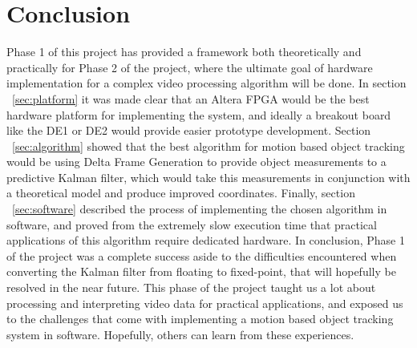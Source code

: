 \documentclass[11pt]{article} %
\begin{document}
\section{Conclusion}
Phase 1 of this project has provided a framework both theoretically and practically for Phase 2 of the project, where the ultimate goal of hardware implementation for a complex video processing algorithm will be done. In section ~\ref{sec:platform} it was made clear that an Altera FPGA would be the best hardware platform for implementing the system, and ideally a breakout board like the DE1 or DE2 would provide easier prototype development. Section ~\ref{sec:algorithm} showed that the best algorithm for motion based object tracking would be using Delta Frame Generation to provide object measurements to a predictive Kalman filter, which would take this measurements in conjunction with a theoretical model and produce improved coordinates. Finally, section ~\ref{sec:software} described the process of implementing the chosen algorithm in software, and proved from the extremely slow execution time that practical applications of this algorithm require dedicated hardware. In conclusion, Phase 1 of the project was a complete success aside to the difficulties encountered when converting the Kalman filter from floating to fixed-point, that will hopefully be resolved in the near future. This phase of the project taught us a lot about processing and interpreting video data for practical applications, and exposed us to the challenges that come with implementing a motion based object tracking system in software. Hopefully, others can learn from these experiences. 
\newpage
\end{document}
